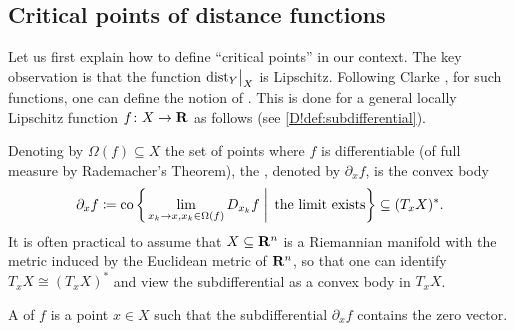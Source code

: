 \subsection{Critical points of distance functions}

Let us first explain how to define ``critical points'' in our context. The key observation is that the function $\mathord{\operatorname{dist}}_Y\big|_X$ is Lipschitz. Following Clarke \cite{Clarke}, for such functions, one can define the notion of . This is done for a general locally Lipschitz function $f \colon X \to \mathbf{R}$ as follows (see \cref{D!def:subdifferential}). 

Denoting by $\Omega(f) \subseteq X$ the set of points where $f$ is differentiable (of full measure by Rademacher's Theorem), the , denoted by $\partial_x f$, is the convex body
\[
  \partial_xf \coloneq \mathrm{co}\left\{ \left. \lim_{x_k \to x, x_k \in \Omega(f)} D_{x_k} f \; \right| \; \textnormal{the limit exists}\right\} \subseteq (T_x X)^*.
\]
It is often practical to assume that $X\subseteq \mathbf{R}^n$ is a Riemannian manifold with the metric induced by the Euclidean metric of $\mathbf{R}^n$, so that one can identify $T_x X \cong (T_x X)^*$ and view the subdifferential as a convex body in $T_x X$.

\begin{definition}
  A  of $f$ is a point $x\in X$ such that the subdifferential $\partial_xf$ contains the zero vector.
\end{definition}

